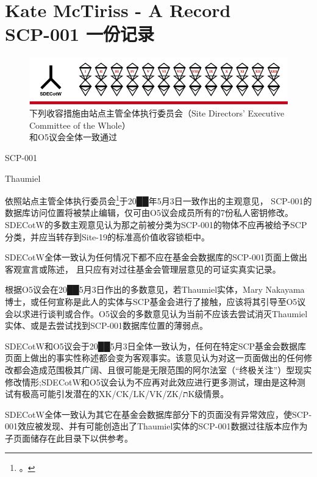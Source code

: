 \chapter[SCP-001 一份记录]{
	Kate McTiriss - A Record \\
	SCP-001 一份记录
}

\label{chap:SCP-001.a.record}

\begin{figure}[H]
	\centering
	\captionsetup{justification=centering}
	\includegraphics[width=\linewidth]{images/SCP.001.a.record.png}
	\caption*{下列收容措施由站点主管全体执行委员会（Site Directors' Executive Committee of the Whole）\\ 和O5议会全体一致通过}
\end{figure}

SCP-001

Thaumiel

依照站点主管全体执行委员会\footnote{。}于20██年5月3日一致作出的主观意见， SCP-001的数据库访问位置将被禁止编辑，仅可由O5议会成员所有的7份私人密钥修改。SDECotW的多数主观意见认为那之前被分类为SCP-001的物体不应再被给予SCP分类，并应当转存到Site-19的标准高价值收容锁柜中。

SDECotW全体一致认为任何情况下都不应在基金会数据库的SCP-001页面上做出客观宣言或陈述， 且只应有对过往基金会管理层意见的可证实真实记录。

根据O5议会在20██5月3日作出的多数意见，若Thaumiel实体，Mary Nakayama博士，或任何宣称是此人的实体与SCP基金会进行了接触，应该将其引导至O5议会以求进行谈判或合作。O5议会的多数意见认为当前不应该去尝试消灭Thaumiel实体、或是去尝试找到SCP-001数据库位置的薄弱点。

SDECotW和O5议会于20██5月3日全体一致认为，任何在特定SCP基金会数据库页面上做出的事实性称述都会变为客观事实。该意见认为对这一页面做出的任何修改都会造成范围极其广阔、且很可能是无限范围的阿尔法室（“终极关注”）型现实修改情形;SDECotW和O5议会认为不应再对此效应进行更多测试，理由是这种测试有极高可能引发潜在的XK/CK/LK/VK/ZK/תK级情景。

SDECotW全体一致认为其它在基金会数据库部分下的页面没有异常效应，使SCP-001效应被发现、并有可能创造出了Thaumiel实体的SCP-001数据过往版本应作为子页面储存在此目录下以供参考。

